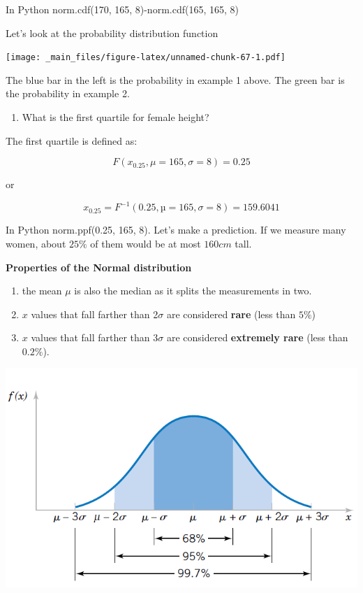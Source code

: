 \documentclass[
]{book}
\providecommand{\tightlist}{%
  \setlength{\itemsep}{0pt}\setlength{\parskip}{0pt}}
\begin{document}
In Python norm.cdf(170, 165, 8)-norm.cdf(165, 165, 8)

Let's look at the probability distribution function

\texttt{[image: \_main\_files/figure-latex/unnamed-chunk-67-1.pdf]}

The blue bar in the left is the probability in example 1 above. The green bar is the probability in example 2.

\begin{enumerate}
\def\labelenumi{\arabic{enumi})}
\setcounter{enumi}{2}
\tightlist
\item
  What is the first quartile for female height?
\end{enumerate}

The first quartile is defined as:

\[F(x_{0.25}, \mu=165, \sigma=8)=0.25\]

or

\[x_{0.25}=F^{-1}(0.25, µ=165, \sigma=8)=159.6041\]

In Python norm.ppf(0.25, 165, 8). Let's make a prediction. If we measure many women, about \(25\%\) of them would be at most \(160cm\) tall.

\textbf{Properties of the Normal distribution}

\begin{enumerate}
\def\labelenumi{\arabic{enumi})}
\item
  the mean \(\mu\) is also the median as it splits the measurements in two.
\item
  \(x\) values that fall farther than 2\(\sigma\) are considered \textbf{rare} (less than \(5\%\))
\item
  \(x\) values that fall farther than 3\(\sigma\) are considered \textbf{extremely rare} (less than \(0.2\%\)).
\end{enumerate}

\includegraphics{./figures/probs.png}
\end{document}
